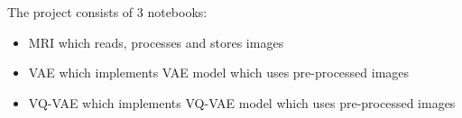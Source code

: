 The project consists of 3 notebooks:

\begin{itemize}
    \item MRI which reads, processes and stores  images
    \item VAE which implements VAE model which uses pre-processed images
    \item VQ-VAE which implements VQ-VAE model which uses pre-processed images
\end{itemize}






